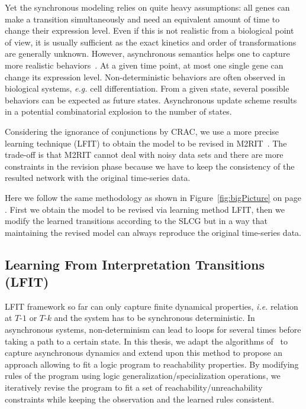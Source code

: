Yet the synchronous modeling relies on quite heavy assumptions:
all genes can make a transition simultaneously and need an equivalent amount of time to change their expression level.
Even if this is not realistic from a biological point of view, it is usually sufficient as the exact kinetics and order of transformations are generally unknown.
However, asynchronous semantics helps one to capture more realistic behaviors~\cite{bernot2009}.
At a given time point, at most one single gene can change its expression level.
Non-deterministic behaviors are often observed in biological systems, \textit{e.g.} cell differentiation.
From a given state, several possible behaviors can be expected as future states.
Asynchronous update scheme results in a potential combinatorial explosion to the number of states.

Considering the ignorance of conjunctions by CRAC, we use a more precise learning technique (LFIT) to obtain the model to be revised in M2RIT~\cite{chai2018using}.
The trade-off is that M2RIT cannot deal with noisy data sets and there are more constraints in the revision phase because we have to keep the consistency of the resulted network with the original time-series data.

Here we follow the same methodology as shown in Figure~\ref{fig:bigPicture} on page \pageref{fig:bigPicture}.
First we obtain the model to be revised via learning method LFIT, then we modify the learned transitions according to the SLCG but in a way that maintaining the revised model can always reproduce the original time-series data.






\subsection{Learning From Interpretation Transitions (LFIT)}\label{sec:lfit}
LFIT framework so far can only capture finite dynamical properties, \textit{i.e.} relation at $T$-$1$ or $T$-$k$ and the system has to be synchronous deterministic.
In asynchronous systems, non-determinism can lead to loops for several times before taking a path to a certain state.
In this thesis, we adapt the algorithms of~\cite{ribeiro2015learning,DMTRICLP15} to capture asynchronous dynamics and extend upon this method to propose an approach allowing to fit a logic program to reachability properties.
By modifying rules of the program using logic generalization/specialization operations, we iteratively revise the program to fit a set of reachability/unreachability constraints while keeping the observation and the learned rules consistent.

